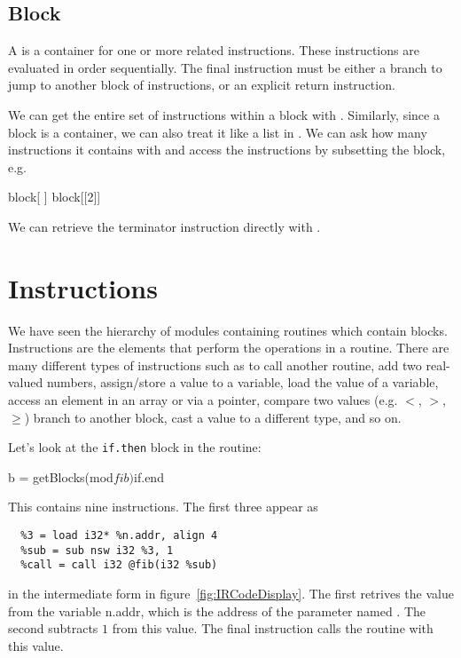 \documentclass[article]{jss}
\begin{document}




\subsection{Block}
A  is a container for one or more related instructions.
These instructions are evaluated in order sequentially.  The final
instruction must be either a branch to jump to another block of
instructions, or an explicit return instruction.

We can get the entire set of instructions within  a block
with .
Similarly, since a block is a container, we can also treat it like a list in \R.  We
can ask how many instructions it contains with  and
access the instructions by subsetting the block, e.g.
\begin{RCode}
 block[ ]  
 block[[2]]
\end{RCode}

We can retrieve the terminator instruction directly with
.

\section{Instructions}
We have seen the hierarchy of modules containing routines which
contain blocks.  Instructions are the elements that perform the
operations in a routine.  There are many different types of
instructions such as to call another routine,
add two real-valued numbers, assign/store
a value to a variable, load the value of a variable,
access an element in an array or via a pointer,
compare two values (e.g. $<$, $>$, $\ge$)
branch to another block, cast a value to a different type, and so on.

Let's look at the \texttt{if.then} block in the
 routine:
\begin{RCode}
b = getBlocks(mod$fib)$if.end
\end{RCode}
This contains nine instructions.
The first three appear as 
\begin{Verbatim}
  %3 = load i32* %n.addr, align 4
  %sub = sub nsw i32 %3, 1
  %call = call i32 @fib(i32 %sub)  
\end{Verbatim}
in the intermediate form in figure~\ref{fig:IRCodeDisplay}.
The first retrives the value from the variable n.addr, which 
is the address of the parameter named .
The second subtracts $1$ from this value.
The final instruction calls the  routine with this value.
\end{document}
